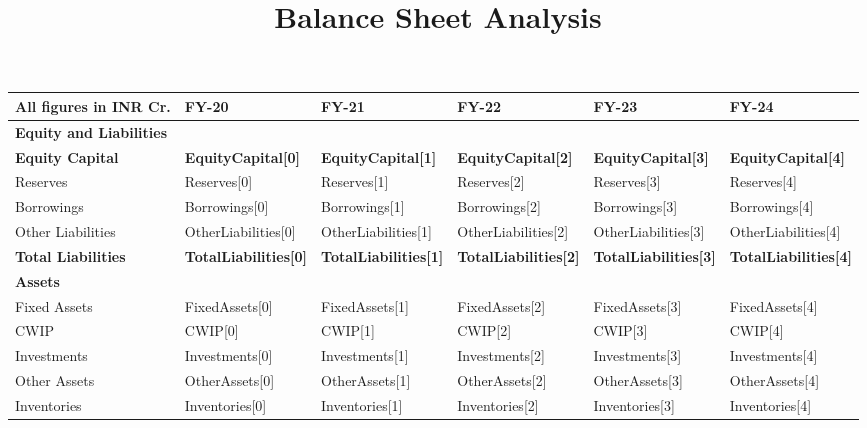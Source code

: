 \documentclass{article}
\title{\textbf{Balance Sheet Analysis}}
\date{}
\begin{document}
\maketitle

\begin{longtable}{|l|*{5}{>{\raggedleft\arraybackslash}p{1.8cm}|}}
    \hline
    \rowcolor{blue!20}
    \textbf{All figures in INR Cr.} & \textbf{FY-20} & \textbf{FY-21} & \textbf{FY-22} & \textbf{FY-23} & \textbf{FY-24} \\
    \hline
    \textbf{Equity and Liabilities} & & & & & \\
    \hline
    \textbf{Equity Capital} & \textbf{{ EquityCapital[0] }} & \textbf{{ EquityCapital[1] }} & \textbf{{ EquityCapital[2] }} & \textbf{{ EquityCapital[3] }} & \textbf{{ EquityCapital[4] }} \\
    \hline
    Reserves & {{ Reserves[0] }} & {{ Reserves[1] }} & {{ Reserves[2] }} & {{ Reserves[3] }} & {{ Reserves[4] }} \\
    \hline
    Borrowings & {{ Borrowings[0] }} & {{ Borrowings[1] }} & {{ Borrowings[2] }} & {{ Borrowings[3] }} & {{ Borrowings[4] }} \\
    \hline
    Other Liabilities & {{ OtherLiabilities[0] }} & {{ OtherLiabilities[1] }} & {{ OtherLiabilities[2] }} & {{ OtherLiabilities[3] }} & {{ OtherLiabilities[4] }} \\
    \hline
    \rowcolor{yellow!20}
    \textbf{Total Liabilities} & \textbf{{ TotalLiabilities[0] }} & \textbf{{ TotalLiabilities[1] }} & \textbf{{ TotalLiabilities[2] }} & \textbf{{ TotalLiabilities[3] }} & \textbf{{ TotalLiabilities[4] }} \\
    \hline
    \textbf{Assets} & & & & & \\
    \hline
    Fixed Assets & {{ FixedAssets[0] }} & {{ FixedAssets[1] }} & {{ FixedAssets[2] }} & {{ FixedAssets[3] }} & {{ FixedAssets[4] }} \\
    \hline
    CWIP & {{ CWIP[0] }} & {{ CWIP[1] }} & {{ CWIP[2] }} & {{ CWIP[3] }} & {{ CWIP[4] }} \\
    \hline
    Investments & {{ Investments[0] }} & {{ Investments[1] }} & {{ Investments[2] }} & {{ Investments[3] }} & {{ Investments[4] }} \\
    \hline
    Other Assets & {{ OtherAssets[0] }} & {{ OtherAssets[1] }} & {{ OtherAssets[2] }} & {{ OtherAssets[3] }} & {{ OtherAssets[4] }} \\
    \hline
    Inventories & {{ Inventories[0] }} & {{ Inventories[1] }} & {{ Inventories[2] }} & {{ Inventories[3] }} & {{ Inventories[4] }} \\

\end{longtable}
\end{document}
